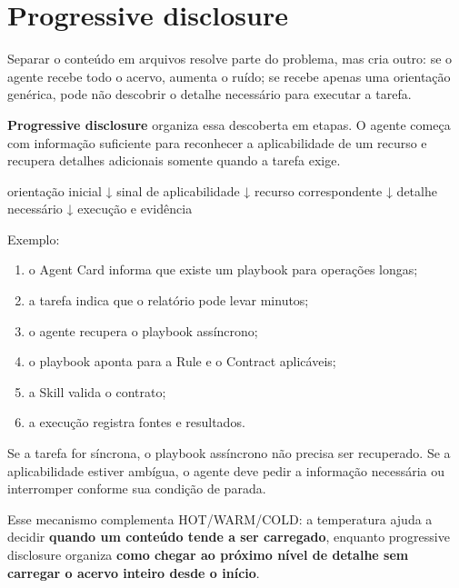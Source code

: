 \documentclass[
  10pt,
  a4paper,
  oneside]{book}
\newenvironment{Shaded}{}{}
\newcommand{\NormalTok}[1]{#1}
\providecommand{\tightlist}{%
  \setlength{\itemsep}{0pt}\setlength{\parskip}{0pt}}
\renewenvironment{Shaded}{\begin{snugshade}}{\end{snugshade}}%
\begin{document}
\hypertarget{progressive-disclosure}{%
\section{Progressive disclosure}\label{progressive-disclosure}}

Separar o conteúdo em arquivos resolve parte do problema, mas cria
outro: se o agente recebe todo o acervo, aumenta o ruído; se recebe
apenas uma orientação genérica, pode não descobrir o detalhe necessário
para executar a tarefa.

\textbf{Progressive disclosure} organiza essa descoberta em etapas. O
agente começa com informação suficiente para reconhecer a aplicabilidade
de um recurso e recupera detalhes adicionais somente quando a tarefa
exige.

\begin{Shaded}
\begin{Highlighting}[]
\NormalTok{orientação inicial}
\NormalTok{        ↓}
\NormalTok{sinal de aplicabilidade}
\NormalTok{        ↓}
\NormalTok{recurso correspondente}
\NormalTok{        ↓}
\NormalTok{detalhe necessário}
\NormalTok{        ↓}
\NormalTok{execução e evidência}
\end{Highlighting}
\end{Shaded}

Exemplo:

\begin{enumerate}
\def\labelenumi{\arabic{enumi}.}
\tightlist
\item
  o Agent Card informa que existe um playbook para operações longas;
\item
  a tarefa indica que o relatório pode levar minutos;
\item
  o agente recupera o playbook assíncrono;
\item
  o playbook aponta para a Rule e o Contract aplicáveis;
\item
  a Skill valida o contrato;
\item
  a execução registra fontes e resultados.
\end{enumerate}

Se a tarefa for síncrona, o playbook assíncrono não precisa ser
recuperado. Se a aplicabilidade estiver ambígua, o agente deve pedir a
informação necessária ou interromper conforme sua condição de parada.

Esse mecanismo complementa HOT/WARM/COLD: a temperatura ajuda a decidir
\textbf{quando um conteúdo tende a ser carregado}, enquanto progressive
disclosure organiza \textbf{como chegar ao próximo nível de detalhe sem
carregar o acervo inteiro desde o início}.
\end{document}
